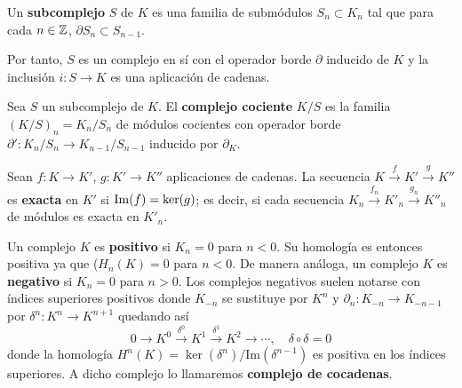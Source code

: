 \begin{definicion}
	Un \textbf{subcomplejo} $S$ de $K$ es una familia de submódulos $S_n \subset K_n$ tal que para cada $n \in \mathbb{Z}$, $\partial S_n \subset S_{n-1}$.
\end{definicion}

Por tanto, $S$ es un complejo en sí con el operador borde $\partial$ inducido de $K$ y la inclusión $i: S \rightarrow K$ es una aplicación de cadenas.

\begin{definicion}
	Sea $S$ un subcomplejo de $K$. El \textbf{complejo cociente} $K/S$ es la familia $(K/S)_n = K_n/S_n$ de módulos cocientes con operador borde $\partial': K_n/S_n \rightarrow K_{n-1}/S_{n-1}$ inducido por $\partial_K$.
\end{definicion}

%

\begin{definicion}
Sean \( f: K \rightarrow K' \), \( g: K' \rightarrow K'' \) aplicaciones de cadenas. La secuencia \( K \xrightarrow{f} K' \xrightarrow{g} K'' \) es \textbf{exacta} en \( K' \) si \( \operatorname{Im}(f) = \ker(g) \); es decir, si cada secuencia \( K_n \xrightarrow{f_n} K'_n \xrightarrow{g_n} K''_n \) de módulos es exacta en \( K'_n \).
\end{definicion}


Un complejo \( K \) es \textbf{positivo} si \( K_n = 0 \) para \( n < 0 \). Su homología es entonces positiva  ya que (\( H_n(K) = 0 \) para \( n < 0 \). De manera análoga, un complejo \( K \) es \textbf{negativo} si \( K_n = 0 \) para \( n > 0 \). Los complejos negativos suelen notarse con índices superiores positivos donde $K_{-n}$ se sustituye por $K^n$ y $\partial_n : K_{-n} \rightarrow K_{-n-1}$ por $\delta^n: K^n \rightarrow K^{n+1}$ quedando así
\[ 0 \to K^0 \xrightarrow{\delta^0} K^1 \xrightarrow{\delta^1} K^2 \to \cdots, \quad \delta \circ \delta = 0 \]
donde la homología \( H^n(K) = \ker(\delta^n)/\text{Im}(\delta^{n-1}) \) es positiva en los índices superiores. A dicho complejo lo llamaremos \textbf{complejo de cocadenas}.

